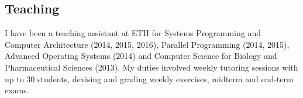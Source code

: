 \documentclass[margin,line]{cv}
\begin{document}
\begin{resume}
    \section{\mysidestyle Teaching}

    I have been a teaching assistant at ETH for Systems Programming and Computer
    Architecture (2014, 2015, 2016), Parallel Programming (2014, 2015), Advanced
    Operating Systems (2014) and Computer Science for Biology and Pharmaceutical
    Sciences (2013). My duties involved weekly tutoring sessions with up to 30
    students, devising and grading weekly exercises, midterm and end-term exams.



\end{resume}
\end{document}
